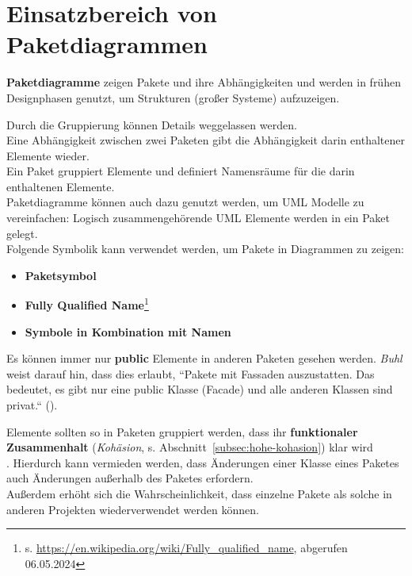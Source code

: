 \section{Einsatzbereich von Paketdiagrammen}

\begin{tcolorbox}
\textbf{Paketdiagramme} zeigen Pakete und ihre Abhängigkeiten und werden in frühen Designphasen genutzt, um Strukturen (großer Systeme) aufzuzeigen.
\end{tcolorbox}

Durch die Gruppierung können Details weggelassen werden.\\
Eine Abhängigkeit zwischen zwei Paketen gibt die Abhängigkeit darin enthaltener Elemente wieder.\\

\noindent
Ein Paket gruppiert Elemente und definiert Namensräume für die darin enthaltenen Elemente.\\

\noindent
Paketdiagramme können auch dazu genutzt werden, um UML Modelle zu vereinfachen: Logisch zusammengehörende UML Elemente werden in ein Paket gelegt.\\

\noindent
Folgende Symbolik kann verwendet werden, um Pakete in Diagrammen zu zeigen:

\begin{itemize}
    \item \textbf{Paketsymbol}
    \item \textbf{Fully Qualified Name}\footnote{
    s. \url{https://en.wikipedia.org/wiki/Fully_qualified_name}, abgerufen 06.05.2024
    }
    \item \textbf{Symbole in Kombination mit Namen}
\end{itemize}

\noindent
Es können immer nur \textbf{public} Elemente in anderen Paketen gesehen werden.
\textit{Buhl} weist darauf hin, dass dies erlaubt, ``Pakete mit Fassaden auszustatten. Das bedeutet, es gibt nur eine public Klasse (Facade) und alle anderen Klassen sind privat.`` (\cite[46]{Buh09}).\\

\begin{tcolorbox}
    Elemente sollten so in Paketen gruppiert werden, dass ihr \textbf{funktionaler Zusammenhalt} (\textit{Kohäsion}, s. Abschnitt~\ref{subsec:hohe-kohasion}) klar wird\\.
    Hierdurch kann vermieden werden, dass Änderungen einer Klasse eines Paketes auch Änderungen außerhalb des Paketes erfordern.\\
    Außerdem erhöht sich die Wahrscheinlichkeit, dass einzelne Pakete als solche in anderen Projekten wiederverwendet werden können.
\end{tcolorbox}
